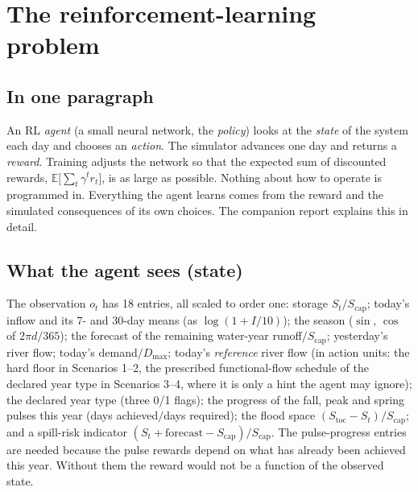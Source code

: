 \documentclass[11pt]{article}
\newcommand{\Scap}{S_{\mathrm{cap}}}
\begin{document}
\section{The reinforcement-learning problem}
\label{sec:rl}

\subsection{In one paragraph}
An RL \emph{agent} (a small neural network, the \emph{policy}) looks at the
\emph{state} of the system each day and chooses an \emph{action}. The
simulator advances one day and returns a \emph{reward}. Training adjusts the
network so that the expected sum of discounted rewards,
$\mathbb{E}\big[\sum_t \gamma^t r_t\big]$, is as large as possible.
Nothing about how to operate is programmed in. Everything the agent learns
comes from the reward and the simulated consequences of its own choices.
The companion report explains this in detail.

\subsection{What the agent sees (state)}
The observation $o_t$ has 18 entries, all scaled to order one:
storage $S_t/\Scap$; today's inflow and its 7- and 30-day means (as
$\log(1+I/10)$); the season ($\sin$, $\cos$ of $2\pi d/365$); the forecast
of the remaining water-year runoff$/\Scap$; yesterday's river flow; today's
demand$/D_{\max}$; today's \emph{reference} river flow (in action units:
the hard floor in Scenarios 1--2, the prescribed functional-flow schedule of
the declared year type in Scenarios 3--4, where it is only a hint the agent
may ignore); the declared
year type (three 0/1 flags); the progress of the fall, peak and spring
pulses this year (days achieved$/$days required); the flood space
$(S_{\mathrm{toc}}-S_t)/\Scap$; and a spill-risk indicator
$(S_t+\text{forecast}-\Scap)/\Scap$. The pulse-progress entries are needed
because the pulse rewards depend on what has already been achieved this
year. Without them the reward would not be a function of the observed
state.
\end{document}
